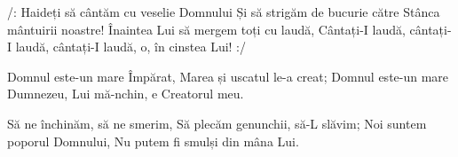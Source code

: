 \beginchorus
/: Haideți să cântăm cu veselie Domnului
Și să strigăm de bucurie către Stânca mântuirii noastre!
Înaintea Lui să mergem toți cu laudă,
Cântați-I laudă, cântați-I laudă, cântați-I laudă, o, în cinstea Lui! :/
\endchorus

\beginverse
Domnul este-un mare Împărat,
Marea și uscatul le-a creat;
Domnul este-un mare Dumnezeu,
Lui mă-nchin, e Creatorul meu.
\endverse

\beginverse
Să ne închinăm, să ne smerim,
Să plecăm genunchii, să-L slăvim;
Noi suntem poporul Domnului,
Nu putem fi smulși din mâna Lui.
\endverse
\endsong
